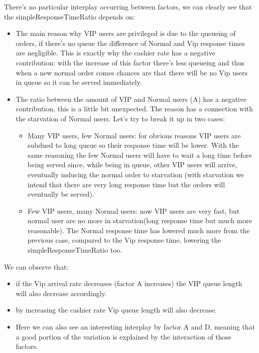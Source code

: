 {{%
 
There's no particular interplay occurring between factors, we can clearly see that the simpleResponseTimeRatio depends on:
\begin{itemize}
    \item The main reason why VIP users are privileged is due to the queueing of orders, if there's no queue the difference of Normal and Vip response times are negligible. This is exactly why the cashier rate has a negative contribution: with the increase of this factor there's less queueing and thus when a new normal order comes chances are that there will be no Vip users in queue so it can be served immediately.
  \item The ratio between the amount of VIP and Normal users (A) has a negative contribution, this is a little bit unexpected. The reason has a connection with the starvation of Normal users. Let's try to break it up in two cases: 
  \begin{itemize}
    \item Many VIP users, few Normal users: for obvious reasons VIP users are subdued to long queue so their response time will be lower. With the same reasoning the few Normal users will have to wait a long time before being served since, while being in queue, other VIP users will arrive, eventually inducing the normal order to starvation (with starvation we intend that there are very long response time but the orders will eventually be served).
    \item Few VIP users, many Normal users: now VIP users are very fast, but normal user are no more in starvation(long response time but much more reasonable). The Normal response time has lowered much more from the previous case, compared to the Vip response time, lowering the simpleResponseTimeRatio too.
    \end{itemize}
\end{itemize}



We can observe that:
\begin{itemize}
    \item if the Vip arrival rate decreases (factor A increases) the VIP queue length will also decrease accordingly.
    \item by increasing the cashier rate Vip queue length will also decrease.
    \item Here we can also see an interesting interplay by factor A and D, meaning that a good portion of the variation is explained by the interaction of those factors.
\end{itemize}

}}
